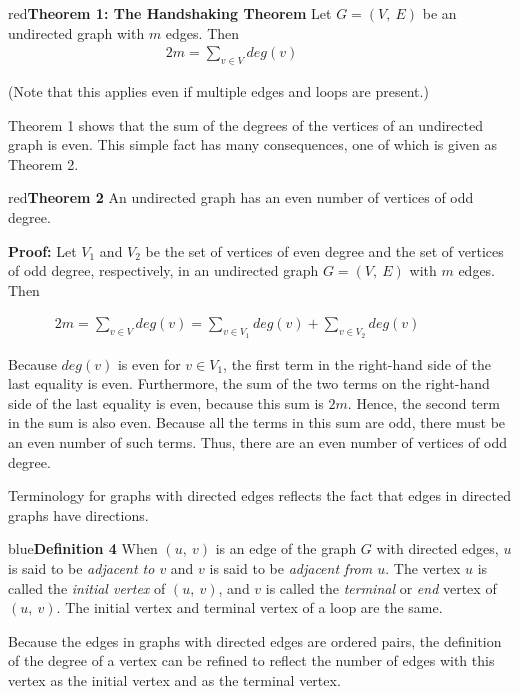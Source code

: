 \documentclass[11pt]{article}
\newenvironment{definition}[1]{\begin{mybox}{blue}{\textbf{Definition #1}}}{\end{mybox}}
\newenvironment{theorem}[1]{\begin{mybox}{red}{\textbf{Theorem #1}}}{\end{mybox}}
\begin{document}
\begin{theorem}{1: The Handshaking Theorem}
Let $G = (V,\ E)$ be an undirected graph with $m$ edges. Then
\begin{align*}
    &2m = \sum_{v \in V} deg(v)& & & & & &
\end{align*}

(Note that this applies even if multiple edges and loops are present.)
\end{theorem}

Theorem 1 shows that the sum of the degrees of the vertices of an undirected graph is even. This simple fact has many consequences, one of which is given as Theorem 2.

\begin{theorem}{2}
An undirected graph has an even number of vertices of odd degree.
\end{theorem}

\textbf{Proof:} Let $V_1$ and $V_2$ be the set of vertices of even degree and the set of vertices of odd degree, respectively, in an undirected graph $G = (V,\ E)$ with $m$ edges. Then

\begin{align*}
    2m = \sum_{v \in V} deg(v) = \sum_{v \in V_1} deg(v) + \sum_{v \in V_2} deg(v)& & & &    
\end{align*}

Because $deg(v)$ is even for $v \in V_1$, the first term in the right-hand side of the last equality is even. Furthermore, the sum of the two terms on the right-hand side of the last equality is even, because this sum is $2m$. Hence, the second term in the sum is also even. Because all the terms in this sum are odd, there must be an even number of such terms. Thus, there are an even number of vertices of odd degree.

Terminology for graphs with directed edges reflects the fact that edges in directed graphs have directions.

\begin{definition}{4}
When $(u,\ v)$ is an edge of the graph $G$ with directed edges, $u$ is said to be \textit{adjacent to $v$} and $v$ is said to be \textit{adjacent from $u$}. The vertex $u$ is called the \textit{initial vertex} of $(u,\ v)$, and $v$ is called the \textit{terminal} or \textit{end} vertex of $(u,\ v)$. The initial vertex and terminal vertex of a loop are the same.
\end{definition}

Because the edges in graphs with directed edges are ordered pairs, the definition of the degree of a vertex can be refined to reflect the number of edges with this vertex as the initial vertex and as the terminal vertex.
\end{document}
